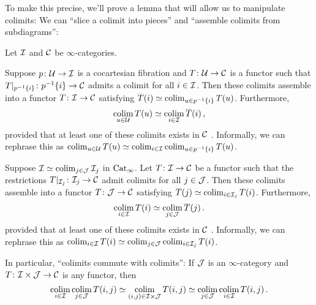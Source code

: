 To make this precise, we'll prove a lemma that will allow us to manipulate colimits: We can \enquote{slice a colimit into pieces} and \enquote{assemble colimits from subdiagrams}:
\begin{lem}\label{lem:ColimitManipulations}
	Let $\mathcal{I}$ and $\mathcal{C}$ be $\infty$-categories.
	\begin{alphanumerate}
		\item Suppose $p\colon \mathcal{U}\rightarrow \mathcal{I}$ is a cocartesian fibration and $T\colon \mathcal{U}\rightarrow \mathcal{C}$ is a functor such that $T|_{p^{-1}\{i\}}\colon p^{-1}\{i\}\rightarrow \mathcal{C}$ admits a colimit for all $i\in \mathcal{I}$. Then these colimits assemble into a functor $\ov T\colon \Ii\rightarrow \Cc$ satisfying $\ov T(i)\simeq \colimit_{u\in p^{-1}\{i\}}T(u)$. Furthermore,\label{claim:SliceColimits}
		\begin{equation*}
			\colimit_{u\in\Uu}T(u)\simeq \colimit_{i\in\Ii}\ov T(i)\,,
		\end{equation*}
		provided that at least one of these colimits exists in $\mathcal{C}$ . Informally, we can rephrase this as $\operatorname*{colim}_{u\in\mathcal{U}}T(u)\simeq \operatorname*{colim}_{i\in\mathcal{I}}\operatorname*{colim}_{u\in p^{-1}\{i\}}T(u)$.
		\item Suppose $\mathcal{I}\simeq \operatorname*{colim}_{j\in\mathcal{J}}\mathcal{I}_j$ in $\mathrm{Cat}_\infty$. Let $T\colon \mathcal{I}\rightarrow \mathcal{C}$ be a functor such that the restrictions $T|_{\mathcal{I}_j}\colon \mathcal{I}_j\rightarrow \mathcal{C}$ admit colimits for all $j\in\mathcal{J}$. Then these colimits assemble into a functor $\ov T\colon \Jj\rightarrow \Cc$ satisfying $\ov T(j)\simeq \colimit_{i\in\Ii_j}T(i)$. Furthermore,
		\label{claim:AssembleColimits}
		\begin{equation*}
			\colimit_{i\in\Ii}T(i)\simeq \colimit_{j\in\Jj}\ov T(j)\,.
		\end{equation*}
		provided that at least one of these colimits exists in $\mathcal{C}$ . Informally, we can rephrase this as $\operatorname*{colim}_{i\in\mathcal{I}}T(i)\simeq \operatorname*{colim}_{j\in\mathcal{J}}\operatorname*{colim}_{i\in\mathcal{I}_j}T(i)$.
	\end{alphanumerate}
	In particular, \enquote{colimits commute with colimits}: If $\mathcal{J}$ is an $\infty$-category and $T\colon \mathcal{I}\times\mathcal{J}\rightarrow \mathcal{C}$ is any functor, then
	\begin{equation*}
		\operatorname*{colim}_{i\in\mathcal{I}}\operatorname*{colim}_{j\in\mathcal{J}}T(i,j)\simeq\operatorname*{colim}_{(i,j)\in\mathcal{I}\times\mathcal{J}}T(i,j)\simeq \operatorname*{colim}_{j\in\mathcal{J}}\operatorname*{colim}_{i\in\mathcal{I}}T(i,j)\,.
	\end{equation*}
\end{lem}
